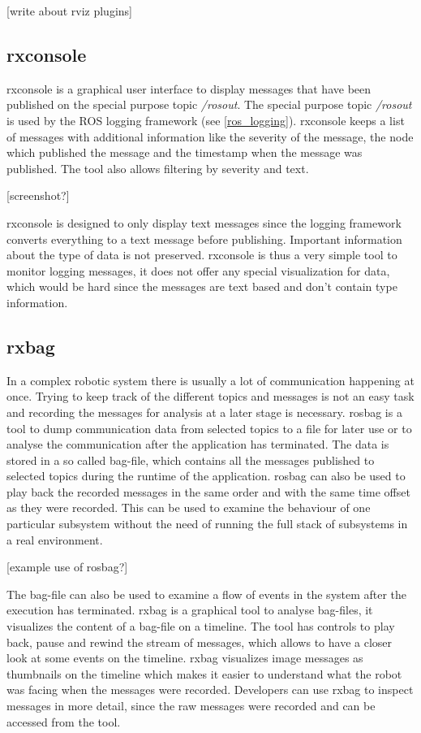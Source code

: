 [write about rviz plugins]

\subsection{rxconsole}
rxconsole is a graphical user interface to display messages that have been published on the special purpose topic \emph{/rosout}. The special purpose topic \emph{/rosout} is used by the ROS logging framework (see \ref{ros_logging}). rxconsole keeps a list of messages with additional information like the severity of the message, the node which published the message and the timestamp when the message was published. The tool also allows filtering by severity and text.

[screenshot?]

rxconsole is designed to only display text messages since the logging framework converts everything to a text message before publishing. Important information about the type of data is not preserved. rxconsole is thus a very simple tool to monitor logging messages, it does not offer any special visualization for data, which would be hard since the messages are text based and don't contain type information.

\subsection{rxbag}
In a complex robotic system there is usually a lot of communication happening at once. Trying to keep track of the different topics and messages is not an easy task and recording the messages for analysis at a later stage is necessary. rosbag is a tool to dump communication data from selected topics to a file for later use or to analyse the communication after the application has terminated. The data is stored in a so called bag-file, which contains all the messages published to selected topics during the runtime of the application. rosbag can also be used to play back the recorded messages in the same order and with the same time offset as they were recorded. This can be used to examine the behaviour of one particular subsystem without the need of running the full stack of subsystems in a real environment.

[example use of rosbag?]

The bag-file can also be used to examine a flow of events in the system after the execution has terminated. rxbag is a graphical tool to analyse bag-files, it visualizes the content of a bag-file on a timeline. The tool has controls to play back, pause and rewind the stream of messages, which allows to have a closer look at some events on the timeline. rxbag visualizes image messages as thumbnails on the timeline which makes it easier to understand what the robot was facing when the messages were recorded. Developers can use rxbag to inspect messages in more detail, since the raw messages were recorded and can be accessed from the tool.

